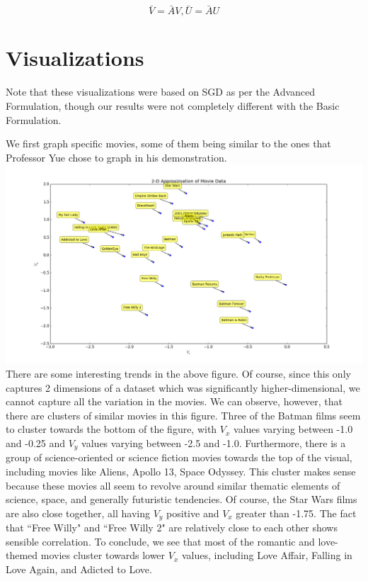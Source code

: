 \documentclass{article}
\begin{document}
$$ \bar{V} = \bar{A} V, \bar{U} = \bar{A} U $$

\section*{Visualizations}
Note that these visualizations were based on SGD as per the Advanced Formulation,
though our results were not completely different with the Basic Formulation.

We first graph specific movies, some of them being similar to the ones
that Professor Yue chose to graph in his demonstration.\\
\includegraphics[width=1\textwidth]{final_graph_1}
There are some interesting trends in the above figure. Of course, since
this only captures 2 dimensions of a dataset which was significantly
higher-dimensional, we cannot capture all the variation in the movies.
We can observe, however, that there are clusters of similar movies
in this figure. Three of the Batman films seem to cluster towards the bottom
of the figure, with $V_{x}$ values varying between -1.0 and -0.25 and
$V_y$ values varying between -2.5 and -1.0. Furthermore, there is a group
of science-oriented or science fiction movies towards the top of the visual,
including movies like Aliens, Apollo 13, Space Odyssey. This cluster makes
sense because these movies all seem to revolve around similar thematic elements
of science, space, and generally futuristic tendencies. Of course, the Star Wars
films are also close together, all having $V_{y}$ positive and $V_x$ greater than
-1.75. The fact that ``Free Willy" and ``Free Willy 2" are relatively close
to each other shows sensible correlation. To conclude, we see that most of
the romantic and love-themed movies cluster towards lower $V_x$ values,
including Love Affair, Falling in Love Again, and Adicted to Love.
\end{document}
